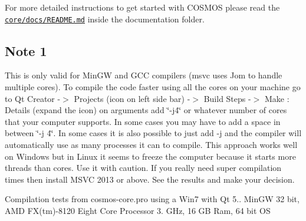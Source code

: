 For more detailed instructions to get started with C\+O\+S\+M\+OS please read the \href{https://bitbucket.org/cosmos-project/core/src/master/docs/}{\tt core/docs/\+R\+E\+A\+D\+M\+E.\+md} inside the documentation folder.

\subsection*{Note 1}

This is only valid for Min\+GW and G\+CC compilers (msvc uses Jom to handle multiple cores). To compile the code faster using all the cores on your machine go to Qt Creator -\/$>$ Projects (icon on left side bar) -\/$>$ Build Steps -\/$>$ Make \+: Details (expand the icon) on arguments add \char`\"{}-\/j4\char`\"{} or whatever number of cores that your computer supports. In some cases you may have to add a space in between \char`\"{}-\/j 4\char`\"{}. In some cases it is also possible to just add \textquotesingle{}-\/j\textquotesingle{} and the compiler will automatically use as many processes it can to compile. This approach works well on Windows but in Linux it seems to freeze the computer because it starts more threads than cores. Use it with caution. If you really need super compilation times then install M\+S\+VC 2013 or above. See the results and make your decision.

Compilation tests from cosmos-\/core.\+pro using a Win7 with Qt 5.. Min\+GW 32 bit, A\+MD F\+X(tm)-\/8120 Eight Core Processor 3. G\+Hz, 16 GB Ram, 64 bit OS

